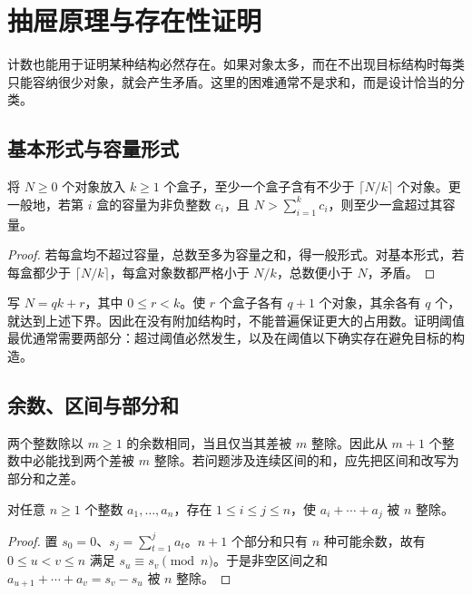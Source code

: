\setcounter{chapter}{3} %
\chapter{抽屉原理与存在性证明}
\label{ch:pigeonhole}

计数也能用于证明某种结构必然存在。如果对象太多，而在不出现目标结构时每类只能容纳很少对象，就会产生矛盾。这里的困难通常不是求和，而是设计恰当的分类。

\section{基本形式与容量形式}

\begin{theorem}
将 $N\ge0$ 个对象放入 $k\ge1$ 个盒子，至少一个盒子含有不少于 $\lceil N/k\rceil$ 个对象。更一般地，若第 $i$ 盒的容量为非负整数 $c_i$，且 $N>\sum_{i=1}^k c_i$，则至少一盒超过其容量。
\end{theorem}
\begin{proof}
若每盒均不超过容量，总数至多为容量之和，得一般形式。对基本形式，若每盒都少于 $\lceil N/k\rceil$，每盒对象数都严格小于 $N/k$，总数便小于 $N$，矛盾。
\end{proof}

写 $N=qk+r$，其中 $0\le r<k$。使 $r$ 个盒子各有 $q+1$ 个对象，其余各有 $q$ 个，就达到上述下界。因此在没有附加结构时，不能普遍保证更大的占用数。证明阈值最优通常需要两部分：超过阈值必然发生，以及在阈值以下确实存在避免目标的构造。

\section{余数、区间与部分和}

两个整数除以 $m\ge1$ 的余数相同，当且仅当其差被 $m$ 整除。因此从 $m+1$ 个整数中必能找到两个差被 $m$ 整除。若问题涉及连续区间的和，应先把区间和改写为部分和之差。

\begin{proposition}
对任意 $n\ge1$ 个整数 $a_1,\ldots,a_n$，存在 $1\le i\le j\le n$，使 $a_i+\cdots+a_j$ 被 $n$ 整除。
\end{proposition}
\begin{proof}
置 $s_0=0$、$s_j=\sum_{t=1}^j a_t$。$n+1$ 个部分和只有 $n$ 种可能余数，故有 $0\le u<v\le n$ 满足 $s_u\equiv s_v\pmod n$。于是非空区间之和 $a_{u+1}+\cdots+a_v=s_v-s_u$ 被 $n$ 整除。
\end{proof}

